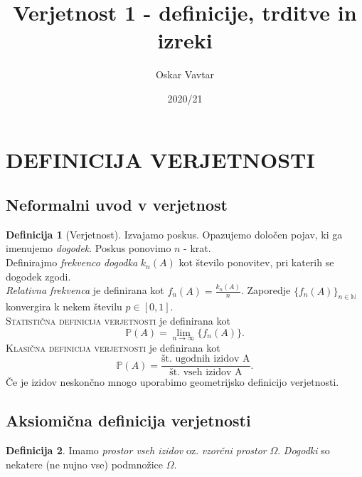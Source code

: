 \documentclass[11pt]{article}
\title{Verjetnost 1 - definicije, trditve in izreki}
\author{Oskar Vavtar}
\date{2020/21}
\theoremstyle{definition}
\newtheorem{definicija}{Definicija}[section]
\theoremstyle{definition}
\theoremstyle{definition}
\theoremstyle{theorem}
\theoremstyle{theorem}
\begin{document}
\maketitle
\pagebreak
\tableofcontents
\pagebreak


\section{DEFINICIJA VERJETNOSTI}


\subsection{Neformalni uvod v verjetnost}

\begin{definicija}[Verjetnost]

Izvajamo poskus. Opazujemo določen pojav, ki ga imenujemo \textit{dogodek}. Poskus ponovimo $n$ - krat. \\
Definirajmo \textit{frekvenco dogodka} $k_n(A)$ kot število ponovitev, pri katerih se dogodek zgodi. \\
\textit{Relativna frekvenca} je definirana kot $f_n(A) = \frac{k_n(A)}{n}$.
Zaporedje $\{f_n(A)\}_{n \in \mathbb{N}}$ konvergira k nekem številu $p \in [0, 1].$ \\
\textsc{Statistična definicija verjetnosti} je definirana kot
$$\mathbb{P}(A) = \lim_{n\to\infty} \{f_n(A)\}.$$
\textsc{Klasična definicija verjetnosti} je definirana kot
$$\mathbb{P}(A) = \frac{\text{št. ugodnih izidov A}}{\text{št. vseh izidov A}}.$$
Če je izidov neskončno mnogo uporabimo geometrijsko definicijo verjetnosti.

\end{definicija}
\vspace{0.5cm}


\subsection{Aksiomična definicija verjetnosti}
\vspace{0.5cm}

\begin{definicija}

Imamo \textit{prostor vseh izidov} oz. \textit{vzorčni prostor} $\Omega$. \textit{Dogodki} so nekatere (ne nujno vse) podmnožice $\Omega$.

\end{definicija}
\vspace{0.5cm}
\end{document}
